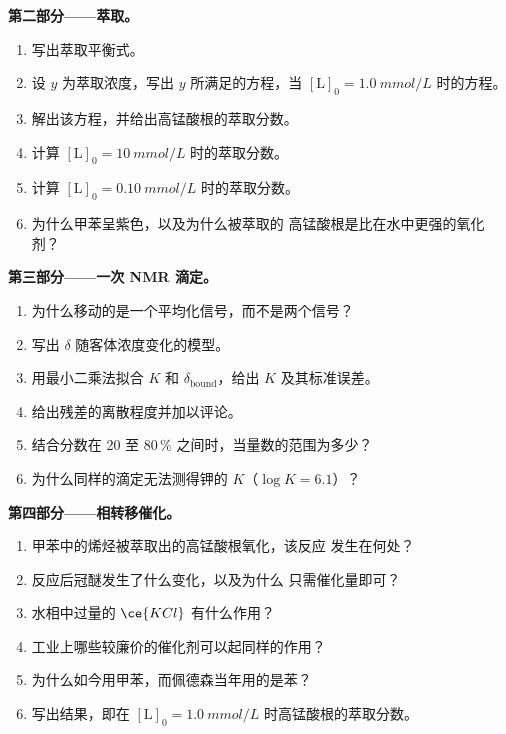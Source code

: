 \begin{problem}
\medskip\noindent\textbf{第二部分——萃取。}
\begin{enumerate}[resume]
  \item 写出萃取平衡式。
  \item 设 $y$ 为萃取浓度，写出 $y$ 所满足的方程，当
        $[\mathrm L]_0 = \qty{1.0}{mmol/L}$ 时的方程。
  \item 解出该方程，并给出高锰酸根的萃取分数。
  \item 计算 $[\mathrm L]_0 = \qty{10}{mmol/L}$ 时的萃取分数。
  \item 计算 $[\mathrm L]_0 = \qty{0.10}{mmol/L}$ 时的萃取分数。
  \item 为什么甲苯呈紫色，以及为什么被萃取的
        高锰酸根是比在水中更强的氧化剂？
\end{enumerate}

\medskip\noindent\textbf{第三部分——一次 NMR 滴定。}
\begin{enumerate}[resume]
  \item 为什么移动的是一个平均化信号，而不是两个信号？
  \item 写出 $\delta$ 随客体浓度变化的模型。
  \item 用最小二乘法拟合 $K$ 和 $\delta_{\mathrm{bound}}$，给出 $K$ 及其标准误差。
  \item 给出残差的离散程度并加以评论。
  \item 结合分数在 20 至 80\,\% 之间时，当量数的范围为多少？
  \item 为什么同样的滴定无法测得钾的 $K$（$\log K = 6.1$）？
\end{enumerate}

\medskip\noindent\textbf{第四部分——相转移催化。}
\begin{enumerate}[resume]
  \item 甲苯中的烯烃被萃取出的高锰酸根氧化，该反应
        发生在何处？
  \item 反应后冠醚发生了什么变化，以及为什么
        只需催化量即可？
  \item 水相中过量的 $\ce{KCl}$ 有什么作用？
  \item 工业上哪些较廉价的催化剂可以起同样的作用？
  \item 为什么如今用甲苯，而佩德森当年用的是苯？
  \item 写出结果，即在
        $[\mathrm L]_0 = \qty{1.0}{mmol/L}$ 时高锰酸根的萃取分数。
\end{enumerate}
\end{problem}
